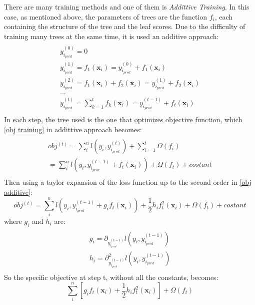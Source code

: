 \documentclass[a4paper, oneside]{book}
\begin{document}
			There are many training methods and one of them is \textit{Addittive Training}. In this case, as mentioned above, the parameters of trees are the function $f_i$, each containing the structure of the tree and the leaf scores. Due to the difficulty of training many trees at the same time, it is used an additive approach:
			\begin{multline}
				\\y_{i_{pred}}^{(0)} = 0 \\
				y_{i_{pred}}^{(1)} = f_1(\textbf{x}_i) = y_{i_{pred}}^{(0)} + f_1(\textbf{x}_i) \\
				y_{i_{pred}}^{(2)} = f_1(\textbf{x}_i) + f_2(\textbf{x}_i)= y_{i_{pred}}^{(1)} + f_2(\textbf{x}_i) \\	
				...\\
				y_{i_{pred}}^{(t)} = \sum_{k=1}^{t}f_k(\textbf{x}_i) = y_{i_{pred}}^{(t-1)} + f_t(\textbf{x}_i)\\		
				\label{y additive}	
			\end{multline}
			In each step, the tree used is the one that optimizes objective function, which \eqref{obj training} in addittive approach becomes:
			\begin{multline}
				\\obj^{(t)} = \sum_{i}^{n}l(y_i,y_{i_{pred}}^{(t)}) + \sum_{i=1}^{t}\Omega(f_i)\\
				= \sum_{i}^{n}l(y_i,y_{i_{pred}}^{(t-1)}+f_t(\textbf{x}_i)) + \Omega(f_t) +costant \\
				\label{obj additive}	
			\end{multline}
			Then using a taylor expansion of the loss function up to the second order in \eqref{obj additive}: 
			\begin{equation}
			obj^{(t)} = \sum_{i}^{n}l(y_i,y_{i_{pred}}^{(t-1)}+g_if_t(\textbf{x}_i)) +\frac{1}{2}h_if_t^2(\textbf{x}_i) + \Omega(f_t) +costant
			\label{obj taylor}	
			\end{equation}
			where $g_i$ and $h_i$ are:
			\begin{multline}
				\\g_i = \partial_{y_{i_{pred}}^{(t-1)}} l(y_i,y_{i_{pred}}^{(t-1)})\\
				h_i = \partial_{y_{i_{pred}}^{(t-1)}}^2 l(y_i,y_{i_{pred}}^{(t-1)})\\
				\label{g and h}	
			\end{multline}
			So the specific objective at step t, without all the constants, becomes:
			\begin{equation}
				\sum_{i}^{n}[g_if_t(\textbf{x}_i) + \frac{1}{2}h_i f_t^2(\textbf{x}_i)] + \Omega(f_t)
				\label{spec obj}
			\end{equation}
\end{document}
